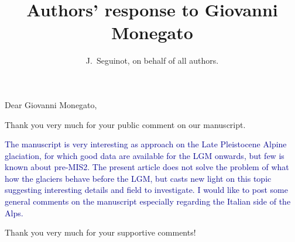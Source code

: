 

\title{Authors' response to Giovanni Monegato}
\author{J.~Seguinot, on behalf of all authors.}


\maketitle
\bigskip


\newcommand{\sechead}[1]{\bigskip\noindent\textbf{#1}}
\newcommand{\referee}[1]{\bigskip\noindent\textcolor{darkblue}{#1}}
\newcommand{\msquote}[1]{\begin{quote}\textit{#1}\end{quote}}
\newcommand{\doi}[1]{doi:\allowbreak\href{http://dx.doi.org/#1}{#1}}

    Dear Giovanni Monegato,

    Thank you very much for your public comment on our manuscript.

    \referee{%
        The manuscript is very interesting as approach on the Late Pleistocene
        Alpine glaciation, for which good data are available for the LGM
        onwards, but few is known about pre-MIS2. The present article does not
        solve the problem of what how the glaciers behave before the LGM, but
        casts new light on this topic suggesting interesting details and field
        to investigate. I would like to post some general comments on the
        manuscript especially regarding the Italian side of the Alps.}

    Thank you very much for your supportive comments!

